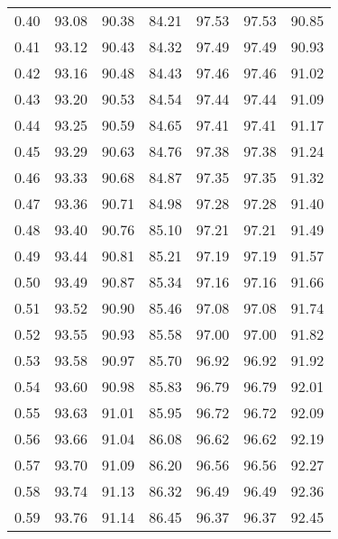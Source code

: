 \begin{tabular}{|c|c|c|c|c|c|c|}
      0.40 &     93.08 &     90.38 &      84.21 &   97.53 &      97.53 &         90.85 \\
      0.41 &     93.12 &     90.43 &      84.32 &   97.49 &      97.49 &         90.93 \\
      0.42 &     93.16 &     90.48 &      84.43 &   97.46 &      97.46 &         91.02 \\
      0.43 &     93.20 &     90.53 &      84.54 &   97.44 &      97.44 &         91.09 \\
      0.44 &     93.25 &     90.59 &      84.65 &   97.41 &      97.41 &         91.17 \\
      0.45 &     93.29 &     90.63 &      84.76 &   97.38 &      97.38 &         91.24 \\
      0.46 &     93.33 &     90.68 &      84.87 &   97.35 &      97.35 &         91.32 \\
      0.47 &     93.36 &     90.71 &      84.98 &   97.28 &      97.28 &         91.40 \\
      0.48 &     93.40 &     90.76 &      85.10 &   97.21 &      97.21 &         91.49 \\
      0.49 &     93.44 &     90.81 &      85.21 &   97.19 &      97.19 &         91.57 \\
      0.50 &     93.49 &     90.87 &      85.34 &   97.16 &      97.16 &         91.66 \\
      0.51 &     93.52 &     90.90 &      85.46 &   97.08 &      97.08 &         91.74 \\
      0.52 &     93.55 &     90.93 &      85.58 &   97.00 &      97.00 &         91.82 \\
      0.53 &     93.58 &     90.97 &      85.70 &   96.92 &      96.92 &         91.92 \\
      0.54 &     93.60 &     90.98 &      85.83 &   96.79 &      96.79 &         92.01 \\
      0.55 &     93.63 &     91.01 &      85.95 &   96.72 &      96.72 &         92.09 \\
      0.56 &     93.66 &     91.04 &      86.08 &   96.62 &      96.62 &         92.19 \\
      0.57 &     93.70 &     91.09 &      86.20 &   96.56 &      96.56 &         92.27 \\
      0.58 &     93.74 &     91.13 &      86.32 &   96.49 &      96.49 &         92.36 \\
      0.59 &     93.76 &     91.14 &      86.45 &   96.37 &      96.37 &         92.45 \\

\end{tabular}
